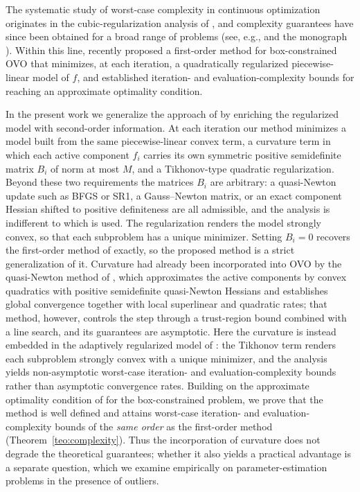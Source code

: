 \documentclass[11pt]{article}
\begin{document}
The systematic study of worst-case complexity in continuous optimization
originates in the cubic-regularization analysis of \cite{nesterov}, and
complexity guarantees have since been obtained for a broad range of problems
(see, e.g., \cite{bgmst2,bgmst1} and the monograph \cite{cogtbook}). Within
this line, \cite{alvarezovo} recently proposed a first-order method for
box-constrained OVO that minimizes, at each iteration, a quadratically
regularized piecewise-linear model of $f$, and established iteration- and
evaluation-complexity bounds for reaching an approximate optimality condition.

In the present work we generalize the approach of \cite{alvarezovo} by
enriching the regularized model with second-order information. At each
iteration our method minimizes a model built from the same piecewise-linear
convex term, a curvature term in which each active component $f_i$ carries its
own symmetric positive semidefinite matrix $B_i$ of norm at most $M$, and a
Tikhonov-type quadratic regularization. Beyond these two requirements the
matrices $B_i$ are arbitrary: a quasi-Newton update such as BFGS or SR1, a
Gauss--Newton matrix, or an exact component Hessian shifted to positive
definiteness are all admissible, and the analysis is indifferent to which is
used. The regularization renders the model strongly convex, so that each
subproblem has a unique minimizer. Setting $B_i=0$ recovers the
first-order method of \cite{alvarezovo} exactly, so the proposed method is a
strict generalization of it. Curvature had already been incorporated into OVO
by the quasi-Newton method of \cite{yano1}, which approximates the active
components by convex quadratics with positive semidefinite quasi-Newton
Hessians and establishes global convergence together with local superlinear
and quadratic rates; that method, however, controls the step through a
trust-region bound combined with a line search, and its guarantees are
asymptotic. Here the curvature is instead embedded in the adaptively
regularized model of \cite{alvarezovo}: the Tikhonov term renders each
subproblem strongly convex with a unique minimizer, and the analysis yields
non-asymptotic worst-case iteration- and evaluation-complexity bounds rather
than asymptotic convergence rates. Building on the approximate optimality
condition of \cite{alvarezovo} for
the box-constrained problem, we prove that the method is well defined and
attains worst-case iteration- and evaluation-complexity bounds of the
\emph{same order} as the first-order method (Theorem~\ref{teo:complexity}). Thus the incorporation of curvature does not degrade
the theoretical guarantees; whether it also yields a practical advantage is a
separate question, which we examine empirically on parameter-estimation
problems in the presence of outliers.
\end{document}
